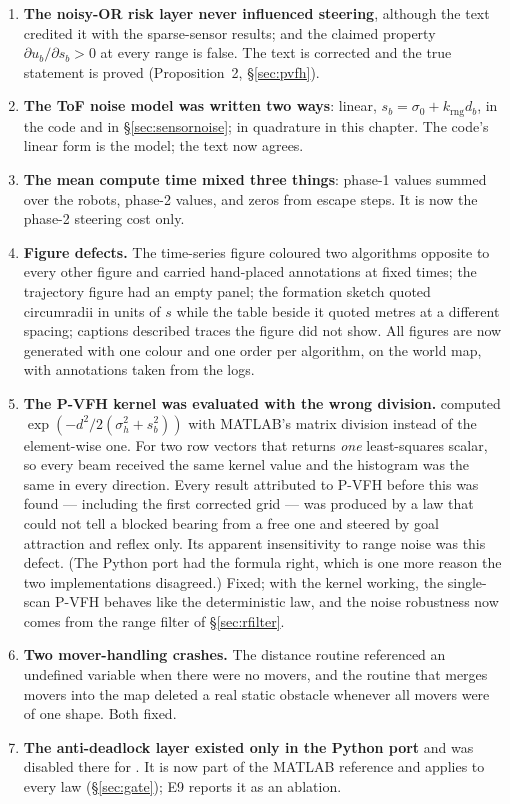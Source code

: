 \begin{enumerate}[leftmargin=1.9em]
body frame by default.
\item \textbf{The noisy-OR risk layer never influenced steering}, although
the text credited it with the sparse-sensor results; and the claimed
property $\partial u_b/\partial s_b > 0$ at every range is false. The text
is corrected and the true statement is proved (Proposition~2,
\S\ref{sec:pvfh}).
\item \textbf{The ToF noise model was written two ways}: linear,
$s_b = \sigma_0 + k_{\mathrm{rng}} d_b$, in the code and in
\S\ref{sec:sensornoise}; in quadrature in this chapter. The code's linear
form is the model; the text now agrees.
\item \textbf{The mean compute time mixed three things}: phase-1 values
summed over the robots, phase-2 values, and zeros from escape steps. It is
now the phase-2 steering cost only.
\item \textbf{Figure defects.} The time-series figure coloured two
algorithms opposite to every other figure and carried hand-placed
annotations at fixed times; the trajectory figure had an empty panel; the
formation sketch quoted circumradii in units of $s$ while the table beside
it quoted metres at a different spacing; captions described traces the
figure did not show. All figures are now generated with one colour and one
order per algorithm, on the world map, with annotations taken from the logs.
\item \textbf{The P-VFH kernel was evaluated with the wrong division.}
 computed $\exp(-d^2 / 2(\sigma_h^2 + s_b^2))$ with
MATLAB's matrix division instead of the element-wise one. For two row
vectors that returns \emph{one} least-squares scalar, so every beam
received the same kernel value and the histogram was the same in every
direction. Every result attributed to P-VFH before this was found ---
including the first corrected grid --- was produced by a law that could
not tell a blocked bearing from a free one and steered by goal attraction
and reflex only. Its apparent insensitivity to range noise was this
defect. (The Python port had the formula right, which is one more reason
the two implementations disagreed.) Fixed; with the kernel working, the
single-scan P-VFH behaves like the deterministic law, and the noise
robustness now comes from the range filter of \S\ref{sec:rfilter}.
\item \textbf{Two mover-handling crashes.} The distance routine referenced
an undefined variable when there were no movers, and the routine that
merges movers into the map deleted a real static obstacle whenever all
movers were of one shape. Both fixed.
\item \textbf{The anti-deadlock layer existed only in the Python port} and
was disabled there for . It is now part of the MATLAB reference
and applies to every law (\S\ref{sec:gate}); E9 reports it as an ablation.
\end{enumerate}

